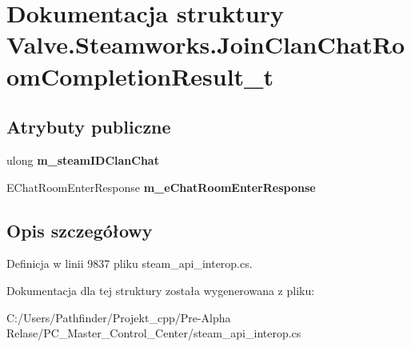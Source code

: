 \hypertarget{struct_valve_1_1_steamworks_1_1_join_clan_chat_room_completion_result__t}{}\section{Dokumentacja struktury Valve.\+Steamworks.\+Join\+Clan\+Chat\+Room\+Completion\+Result\+\_\+t}
\label{struct_valve_1_1_steamworks_1_1_join_clan_chat_room_completion_result__t}
\subsection*{Atrybuty publiczne}
\begin{DoxyCompactItemize}
\item 
\mbox{\label{struct_valve_1_1_steamworks_1_1_join_clan_chat_room_completion_result__t_afbbdb7b2ace8c98a444b77487c71b0c1}} 
ulong {\bfseries m\+\_\+steam\+I\+D\+Clan\+Chat}
\item 
\mbox{\label{struct_valve_1_1_steamworks_1_1_join_clan_chat_room_completion_result__t_a2a13020ba1c97c01933820d9e28a3b8e}} 
E\+Chat\+Room\+Enter\+Response {\bfseries m\+\_\+e\+Chat\+Room\+Enter\+Response}
\end{DoxyCompactItemize}


\subsection{Opis szczegółowy}


Definicja w linii 9837 pliku steam\+\_\+api\+\_\+interop.\+cs.



Dokumentacja dla tej struktury została wygenerowana z pliku\+:\begin{DoxyCompactItemize}
\item 
C\+:/\+Users/\+Pathfinder/\+Projekt\+\_\+cpp/\+Pre-\/\+Alpha Relase/\+P\+C\+\_\+\+Master\+\_\+\+Control\+\_\+\+Center/steam\+\_\+api\+\_\+interop.\+cs\end{DoxyCompactItemize}
